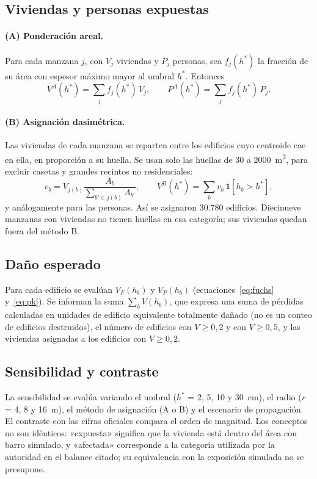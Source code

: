 \documentclass[10pt,a4paper]{article}
\begin{document}
\subsection{Viviendas y personas expuestas}
\paragraph{(A) Ponderación areal.} Para cada manzana $j$, con $V_j$ viviendas y $P_j$ personas, sea $f_j(h^*)$ la fracción de su área con espesor máximo mayor al umbral $h^*$. Entonces
\begin{equation}
V^{A}(h^*)=\sum_j f_j(h^*)\,V_j,\qquad P^{A}(h^*)=\sum_j f_j(h^*)\,P_j .
\end{equation}
\paragraph{(B) Asignación dasimétrica.} Las viviendas de cada manzana se reparten entre los edificios cuyo centroide cae en ella, en proporción a su huella. Se usan solo las huellas de 30 a \SI{2000}{m^2}, para excluir casetas y grandes recintos no residenciales:
\begin{equation}
v_b=V_{j(b)}\frac{A_b}{\sum_{b'\in j(b)}A_{b'}},\qquad V^{B}(h^*)=\sum_b v_b\,\mathbf 1[h_b>h^*],
\end{equation}
y análogamente para las personas. Así se asignaron 30.780 edificios. Diecinueve manzanas con viviendas no tienen huellas en esa categoría; sus viviendas quedan fuera del método B.

\subsection{Daño esperado}
Para cada edificio se evalúan $V_F(h_b)$ y $V_P(h_b)$ (ecuaciones~\ref{eq:fuchs} y~\ref{eq:pk}). Se informan la suma $\sum_b V(h_b)$, que expresa una suma de pérdidas calculadas en unidades de edificio equivalente totalmente dañado (no es un conteo de edificios destruidos), el número de edificios con $V\geq0{,}2$ y con $V\geq0{,}5$, y las viviendas asignadas a los edificios con $V\geq0{,}2$.

\subsection{Sensibilidad y contraste}
La sensibilidad se evalúa variando el umbral ($h^*$ = 2, 5, 10 y \SI{30}{cm}), el radio ($r$ = 4, 8 y \SI{16}{m}), el método de asignación (A o B) y el escenario de propagación. El contraste con las cifras oficiales compara el orden de magnitud. Los conceptos no son idénticos: «expuesta» significa que la vivienda está dentro del área con barro simulado, y «afectada» corresponde a la categoría utilizada por la autoridad en el balance citado; su equivalencia con la exposición simulada no se presupone.
\end{document}
